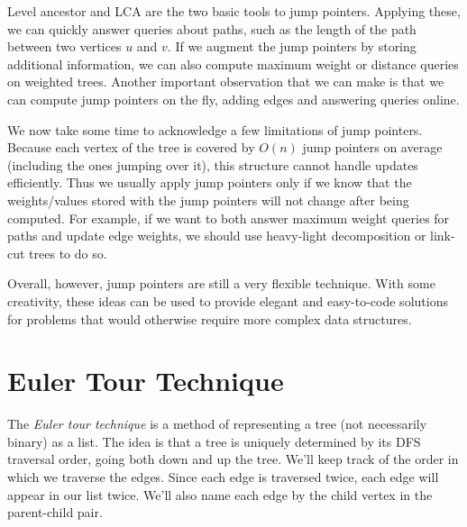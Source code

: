 Level ancestor and LCA are the two basic tools to jump pointers. Applying these, we can quickly answer queries about paths, such as the length of the path between two vertices $u$ and $v$. If we augment the jump pointers by storing additional information, we can also compute maximum weight or distance queries on weighted trees. Another important observation that we can make is that we can compute jump pointers on the fly, adding edges and answering queries online.

We now take some time to acknowledge a few limitations of jump pointers. Because each vertex of the tree is covered by $O(n)$ jump pointers on average (including the ones jumping over it), this structure cannot handle updates efficiently. Thus we usually apply jump pointers only if we know that the weights/values stored with the jump pointers will not change after being computed. For example, if we want to both answer maximum weight queries for paths and update edge weights, we should use heavy-light decomposition or link-cut trees to do so.

Overall, however, jump pointers are still a very flexible technique. With some creativity, these ideas can be used to provide elegant and easy-to-code solutions for problems that would otherwise require more complex data structures.

\section{Euler Tour Technique}

The \textit{Euler tour technique} is a method of representing a tree (not necessarily binary) as a list. The idea is that a tree is uniquely determined by its DFS traversal order, going both down and up the tree. We'll keep track of the order in which we traverse the edges. Since each edge is traversed twice, each edge will appear in our list twice. We'll also name each edge by the child vertex in the parent-child pair.

